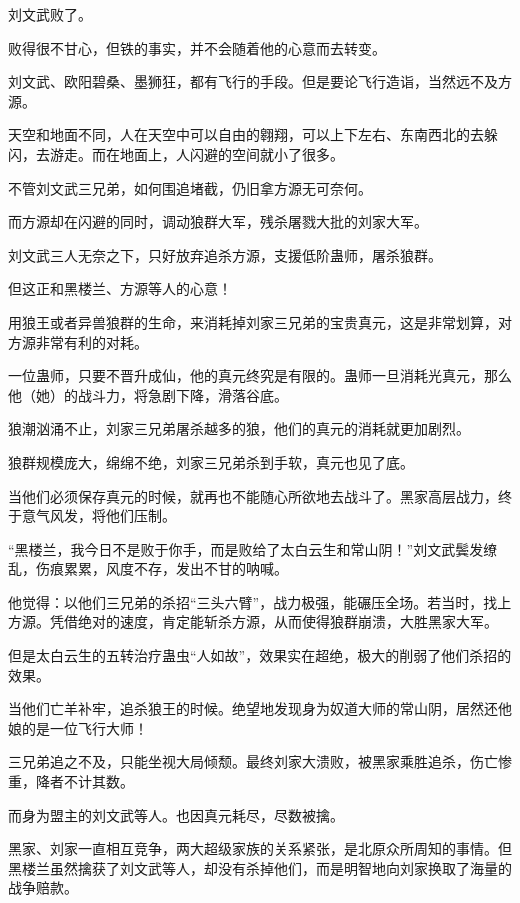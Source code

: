 
\begin{this_body}

刘文武败了。

败得很不甘心，但铁的事实，并不会随着他的心意而去转变。

刘文武、欧阳碧桑、墨狮狂，都有飞行的手段。但是要论飞行造诣，当然远不及方源。

天空和地面不同，人在天空中可以自由的翱翔，可以上下左右、东南西北的去躲闪，去游走。而在地面上，人闪避的空间就小了很多。

不管刘文武三兄弟，如何围追堵截，仍旧拿方源无可奈何。

而方源却在闪避的同时，调动狼群大军，残杀屠戮大批的刘家大军。

刘文武三人无奈之下，只好放弃追杀方源，支援低阶蛊师，屠杀狼群。

但这正和黑楼兰、方源等人的心意！

用狼王或者异兽狼群的生命，来消耗掉刘家三兄弟的宝贵真元，这是非常划算，对方源非常有利的对耗。

一位蛊师，只要不晋升成仙，他的真元终究是有限的。蛊师一旦消耗光真元，那么他（她）的战斗力，将急剧下降，滑落谷底。

狼潮汹涌不止，刘家三兄弟屠杀越多的狼，他们的真元的消耗就更加剧烈。

狼群规模庞大，绵绵不绝，刘家三兄弟杀到手软，真元也见了底。

当他们必须保存真元的时候，就再也不能随心所欲地去战斗了。黑家高层战力，终于意气风发，将他们压制。

“黑楼兰，我今日不是败于你手，而是败给了太白云生和常山阴！”刘文武鬓发缭乱，伤痕累累，风度不存，发出不甘的呐喊。

他觉得：以他们三兄弟的杀招“三头六臂”，战力极强，能碾压全场。若当时，找上方源。凭借绝对的速度，肯定能斩杀方源，从而使得狼群崩溃，大胜黑家大军。

但是太白云生的五转治疗蛊虫“人如故”，效果实在超绝，极大的削弱了他们杀招的效果。

当他们亡羊补牢，追杀狼王的时候。绝望地发现身为奴道大师的常山阴，居然还他娘的是一位飞行大师！

三兄弟追之不及，只能坐视大局倾颓。最终刘家大溃败，被黑家乘胜追杀，伤亡惨重，降者不计其数。

而身为盟主的刘文武等人。也因真元耗尽，尽数被擒。

黑家、刘家一直相互竞争，两大超级家族的关系紧张，是北原众所周知的事情。但黑楼兰虽然擒获了刘文武等人，却没有杀掉他们，而是明智地向刘家换取了海量的战争赔款。


\end{this_body}
